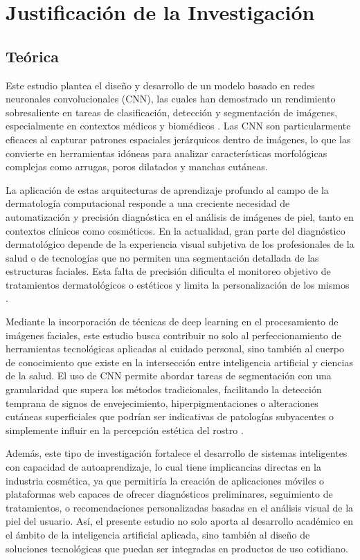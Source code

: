 \section{Justificación de la Investigación}

\subsection{Teórica}

Este estudio plantea el diseño y desarrollo de un modelo basado en redes neuronales convolucionales (CNN), las cuales han demostrado un rendimiento sobresaliente en tareas de clasificación, detección y segmentación de imágenes, especialmente en contextos médicos y biomédicos \parencite{esteva2017}. Las CNN son particularmente eficaces al capturar patrones espaciales jerárquicos dentro de imágenes, lo que las convierte en herramientas idóneas para analizar características morfológicas complejas como arrugas, poros dilatados y manchas cutáneas.

La aplicación de estas arquitecturas de aprendizaje profundo al campo de la dermatología computacional responde a una creciente necesidad de automatización y precisión diagnóstica en el análisis de imágenes de piel, tanto en contextos clínicos como cosméticos. En la actualidad, gran parte del diagnóstico dermatológico depende de la experiencia visual subjetiva de los profesionales de la salud o de tecnologías que no permiten una segmentación detallada de las estructuras faciales. Esta falta de precisión dificulta el monitoreo objetivo de tratamientos dermatológicos o estéticos y limita la personalización de los mismos \parencite{lee2020}.

Mediante la incorporación de técnicas de deep learning en el procesamiento de imágenes faciales, este estudio busca contribuir no solo al perfeccionamiento de herramientas tecnológicas aplicadas al cuidado personal, sino también al cuerpo de conocimiento que existe en la intersección entre inteligencia artificial y ciencias de la salud. El uso de CNN permite abordar tareas de segmentación con una granularidad que supera los métodos tradicionales, facilitando la detección temprana de signos de envejecimiento, hiperpigmentaciones o alteraciones cutáneas superficiales que podrían ser indicativas de patologías subyacentes o simplemente influir en la percepción estética del rostro \parencite{phillips2020, gao2018}.

Además, este tipo de investigación fortalece el desarrollo de sistemas inteligentes con capacidad de autoaprendizaje, lo cual tiene implicancias directas en la industria cosmética, ya que permitiría la creación de aplicaciones móviles o plataformas web capaces de ofrecer diagnósticos preliminares, seguimiento de tratamientos, o recomendaciones personalizadas basadas en el análisis visual de la piel del usuario. Así, el presente estudio no solo aporta al desarrollo académico en el ámbito de la inteligencia artificial aplicada, sino también al diseño de soluciones tecnológicas que puedan ser integradas en productos de uso cotidiano.

